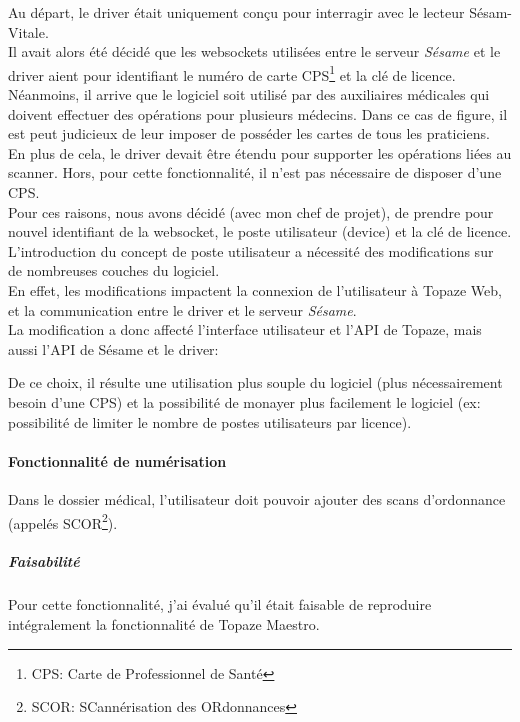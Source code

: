 Au départ, le driver était uniquement conçu pour interragir avec le lecteur Sésam-Vitale.\\ Il avait alors été décidé que les websockets utilisées entre le serveur \textit{Sésame} et le driver aient pour identifiant le numéro de carte CPS\footnote{CPS: Carte de Professionnel de Santé} et la clé de licence.\\
Néanmoins, il arrive que le logiciel soit utilisé par des auxiliaires médicales qui doivent effectuer des opérations pour plusieurs médecins. Dans ce cas de figure, il est peut judicieux de leur imposer de posséder les cartes de tous les praticiens. \\
En plus de cela, le driver devait être étendu pour supporter les opérations liées au scanner. Hors, pour cette fonctionnalité, il n'est pas nécessaire de disposer d'une CPS.\\
Pour ces raisons, nous avons décidé (avec mon chef de projet), de prendre pour nouvel identifiant de la websocket, le poste utilisateur (device) et la clé de licence. \\

L'introduction du concept de poste utilisateur a nécessité des modifications sur de nombreuses couches du logiciel.\\
En effet, les modifications impactent la connexion de l'utilisateur à Topaze Web, et la communication entre le driver et le     
serveur \textit{Sésame}. \\
La modification a donc affecté l'interface utilisateur et l'API de Topaze, mais aussi l'API de Sésame et le driver:

De ce choix, il résulte une utilisation plus souple du logiciel (plus nécessairement besoin d'une CPS) et la possibilité de monayer plus facilement le logiciel (ex: possibilité de limiter le nombre de postes utilisateurs par licence).

\paragraph*{Fonctionnalité de numérisation}
Dans le dossier médical, l'utilisateur doit pouvoir ajouter des scans d'ordonnance (appelés SCOR\footnote{SCOR: SCannérisation des ORdonnances}).\\

\subparagraph*{Faisabilité}
Pour cette fonctionnalité, j'ai évalué qu'il était faisable de reproduire intégralement la fonctionnalité de Topaze Maestro.\\

